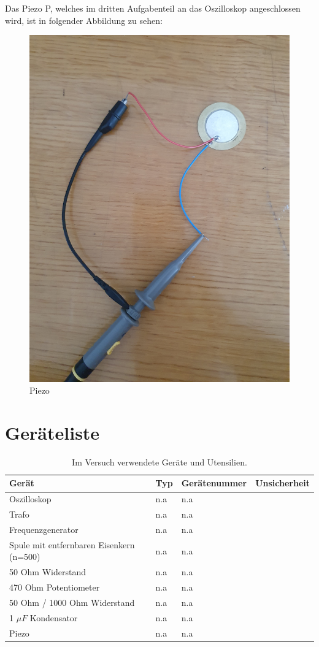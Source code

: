 \documentclass[12pt,a4paper,twoside]{article}
\begin{document}
\noindent
Das Piezo P, welches im dritten Aufgabenteil an das Oszilloskop angeschlossen wird, ist in folgender Abbildung zu sehen:

\begin{figure}[H]
    \centering
    \includegraphics[width=0.6\linewidth, angle=0]{nudes/Piezo.jpg}
    \caption{Piezo}
    \label{fig:Piezo}
\end{figure}



\section{Geräteliste} %

    \begin{table}[H]
        \centering
        \caption{Im Versuch verwendete Geräte und Utensilien.}
        \label{tab:geraete}
        \begin{tabular}{| l | l | l | l |}
            \hline
            Gerät   & Typ   & Gerätenummer  & Unsicherheit \\
            \hline
            Oszilloskop & {n.a} & {n.a} \\
            Trafo & {n.a} & {n.a} \\
            Frequenzgenerator & {n.a} & {n.a} \\
            Spule mit entfernbaren Eisenkern (n=500) & {n.a} & {n.a} \\
            50 Ohm Widerstand & {n.a} & {n.a} \\
            470 Ohm Potentiometer & {n.a} & {n.a} \\
            50 Ohm / 1000 Ohm Widerstand & {n.a} & {n.a} \\
            1 $\mu F$ Kondensator& {n.a} & {n.a} \\
            Piezo & {n.a} & {n.a} \\
            \hline
        \end{tabular}
    \end{table}
\end{document}
